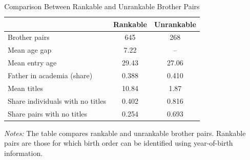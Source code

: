 \begin{table}[H]
\centering
\caption{Comparison Between Rankable and Unrankable Brother Pairs}
\label{tab:rankable_compare}

\begin{tablebody}
\begin{tabular}{l c c}
\toprule
 & \textbf{Rankable} & \textbf{Unrankable} \\
\midrule
Brother pairs & 645 & 268 \\
Mean age gap & 7.22 & -- \\
Mean entry age & 29.43 & 27.06 \\
Father in academia (share) & 0.388 & 0.410 \\
Mean titles & 10.84 & 1.87 \\
Share individuals with no titles & 0.402 & 0.816 \\
Share pairs with no titles & 0.254 & 0.693 \\
\bottomrule
\end{tabular}
\end{tablebody}

\vspace{4pt}
\begin{minipage}{\textwidth}
\footnotesize
\textit{Notes:} The table compares rankable and unrankable brother pairs. Rankable pairs are those for which birth order can be identified using year-of-birth information.
\end{minipage}

\end{table}